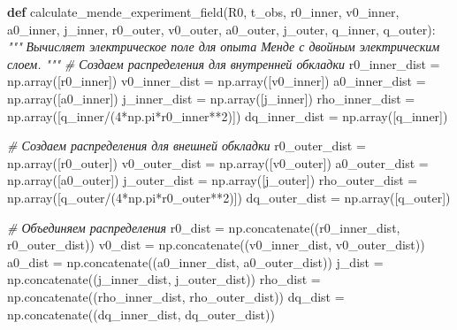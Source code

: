 \documentclass[11pt]{article}
\newenvironment{Shaded}{}{}
\newcommand{\KeywordTok}[1]{\textcolor[rgb]{0.00,0.44,0.13}{\textbf{{#1}}}}
\newcommand{\DecValTok}[1]{\textcolor[rgb]{0.25,0.63,0.44}{{#1}}}
\newcommand{\CommentTok}[1]{\textcolor[rgb]{0.38,0.63,0.69}{\textit{{#1}}}}
\newcommand{\NormalTok}[1]{{#1}}
\newcommand{\OperatorTok}[1]{\textcolor[rgb]{0.40,0.40,0.40}{{#1}}}
\begin{document}
\begin{Shaded}
\begin{Highlighting}[]
\KeywordTok{def}\NormalTok{ calculate_mende_experiment_field(R0, t_obs, }
\NormalTok{                                   r0_inner, v0_inner, a0_inner, j_inner,}
\NormalTok{                                   r0_outer, v0_outer, a0_outer, j_outer,}
\NormalTok{                                   q_inner, q_outer):}
    \CommentTok{"""}
\CommentTok{    Вычисляет электрическое поле для опыта Менде с двойным электрическим слоем.}
\CommentTok{    """}
    \CommentTok{# Создаем распределения для внутренней обкладки}
\NormalTok{    r0_inner_dist }\OperatorTok{=}\NormalTok{ np.array([r0_inner])}
\NormalTok{    v0_inner_dist }\OperatorTok{=}\NormalTok{ np.array([v0_inner])}
\NormalTok{    a0_inner_dist }\OperatorTok{=}\NormalTok{ np.array([a0_inner])}
\NormalTok{    j_inner_dist }\OperatorTok{=}\NormalTok{ np.array([j_inner])}
\NormalTok{    rho_inner_dist }\OperatorTok{=}\NormalTok{ np.array([q_inner}\OperatorTok{/}\NormalTok{(}\DecValTok{4}\OperatorTok{*}\NormalTok{np.pi}\OperatorTok{*}\NormalTok{r0_inner}\OperatorTok{**}\DecValTok{2}\NormalTok{)])}
\NormalTok{    dq_inner_dist }\OperatorTok{=}\NormalTok{ np.array([q_inner])}

    \CommentTok{# Создаем распределения для внешней обкладки}
\NormalTok{    r0_outer_dist }\OperatorTok{=}\NormalTok{ np.array([r0_outer])}
\NormalTok{    v0_outer_dist }\OperatorTok{=}\NormalTok{ np.array([v0_outer])}
\NormalTok{    a0_outer_dist }\OperatorTok{=}\NormalTok{ np.array([a0_outer])}
\NormalTok{    j_outer_dist }\OperatorTok{=}\NormalTok{ np.array([j_outer])}
\NormalTok{    rho_outer_dist }\OperatorTok{=}\NormalTok{ np.array([q_outer}\OperatorTok{/}\NormalTok{(}\DecValTok{4}\OperatorTok{*}\NormalTok{np.pi}\OperatorTok{*}\NormalTok{r0_outer}\OperatorTok{**}\DecValTok{2}\NormalTok{)])}
\NormalTok{    dq_outer_dist }\OperatorTok{=}\NormalTok{ np.array([q_outer])}

    \CommentTok{# Объединяем распределения}
\NormalTok{    r0_dist }\OperatorTok{=}\NormalTok{ np.concatenate((r0_inner_dist, r0_outer_dist))}
\NormalTok{    v0_dist }\OperatorTok{=}\NormalTok{ np.concatenate((v0_inner_dist, v0_outer_dist))}
\NormalTok{    a0_dist }\OperatorTok{=}\NormalTok{ np.concatenate((a0_inner_dist, a0_outer_dist))}
\NormalTok{    j_dist }\OperatorTok{=}\NormalTok{ np.concatenate((j_inner_dist, j_outer_dist))}
\NormalTok{    rho_dist }\OperatorTok{=}\NormalTok{ np.concatenate((rho_inner_dist, rho_outer_dist))}
\NormalTok{    dq_dist }\OperatorTok{=}\NormalTok{ np.concatenate((dq_inner_dist, dq_outer_dist))}


\end{Highlighting}
\end{Shaded}
\end{document}
